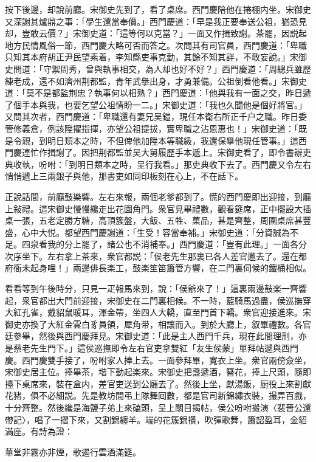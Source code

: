 按下後邊，却說前廳。宋御史先到了，看了桌席。西門慶陪他在捲棚内坐。宋御史又深謝其爐鼎之事：「學生還當奉價。」西門慶道：「早是我正要奉送公祖，猶恐見却，豈敢云價？」宋御史道：「這等何以克當？」一面又作揖致謝。茶罷，因説起地方民情風俗一節，西門慶大略可否而答之。次問其有司官員，西門慶道：「卑職只知其本府胡正尹民望素着，李知縣吏事克勤，其餘不知其詳，不敢妄說。」宋御史問道：「守禦周秀，曾與執事相交，為人却也好不好？」西門慶道：「周總兵雖歷練老成，還不如濟州荆都監，青年武擧出身，才勇兼備。公祖倒看他看。」宋御史道：「莫不是都監荆忠？執事何以相熟？」西門慶道：「他與我有一面之交，昨日遞了個手本與我，也要乞望公祖情盼一二。」宋御史道：「我也久聞他是個好將官。」又問其次者，西門慶道：「卑職還有妻兄吴鎧，現任本衛右所正千户之職。昨日委管修義倉，例該陞擢指揮，亦望公祖提拔，實卑職之沾恩惠也！」宋御史道：「既是令親，到明日類本之時，不但俾他加陞本等職級，我還保擧他現任管事。」這西門慶連忙作揖謝了。因把荆都監並吴大舅履歷手本遞上。宋御史看了，即令書辦吏典收執，吩咐：「到明日類本之時，呈行我看。」那吏典收下去了。西門慶又令左右悄悄遞上三兩銀子與他，那書吏如同印板刻在心上，不在話下。

正說話間，前廳鼓樂響。左右來報，兩個老爹都到了。慌的西門慶即出迎接，到廳上敍禮。這宋御史慢慢纔走出花園角門。衆官見畢禮數，觀看筵席，正中擺設大插桌一張，五老定勝方糖，高頂簇盤，大飯、五牲、菓品，甚是齊整，周圍桌席甚豐盛，心中大悦。都望西門慶謝道：「生受！容當奉補。」宋御史道：「分資誠為不足。四泉看我的分上罷了，諸公也不消補奉。」西門慶道：「豈有此理。」一面各分次序坐下。左右拿上茶來，衆官都説：「侯老先生那裏已各人差官邀去了。還在都府衙未起身哩！」兩邊俳長楽工，鼓楽笙笛簫管方響，在二門裏伺候的鐵桶相似。

看看等到午後時分，只見一疋報馬來到，說：「侯爺來了！」這裏兩邊鼓楽一齊響起，衆官都出大門前迎接，宋御史在二門裏相候。不一時，藍騎馬過盡，侯巡撫穿大紅孔雀，戴貂鼠暖耳，渾金帶，坐四人大轎，直至門首下轎。衆官迎接進來。宋御史亦換了大紅金雲白豸員領，犀角带，相讓而入。到於大廳上，叙畢禮數。各官廷參畢，然後與西門慶拜見。宋御史道：「此是主人西門千兵，現在此間理刑，亦是蔡老先生門下。」這侯巡撫即令左右官吏拿雙紅「友生侯蒙」單拜帖遞與西門慶。西門慶雙手接了，吩咐家人捧上去。一面參拜畢，寬衣上坐。衆官兩傍僉坐，宋御史居主位。捧畢茶，堦下動起楽來。宋御史把盞遞酒，簪花，捧上尺頭，隨即擡下桌席來，裝在盒内，差官吏送到公廳去了。然後上坐，獻湯飯，厨役上來割獻花猪，俱不必細説。先是教坊間弔上隊舞囘數，都是官司新錦繡衣裝，撮弄百戲，十分齊整。然後纔是海鹽子弟上來磕頭，呈上關目揭帖，侯公吩咐搬演〈裴晉公還帶記〉，唱了一摺下來，又割錦纏羊。端的花簇錦攢，吹彈歌舞，簫韶盈耳，金貂滿座。有詩為證：

華堂非霧亦非煙，歌遏行雲酒滿筵。


